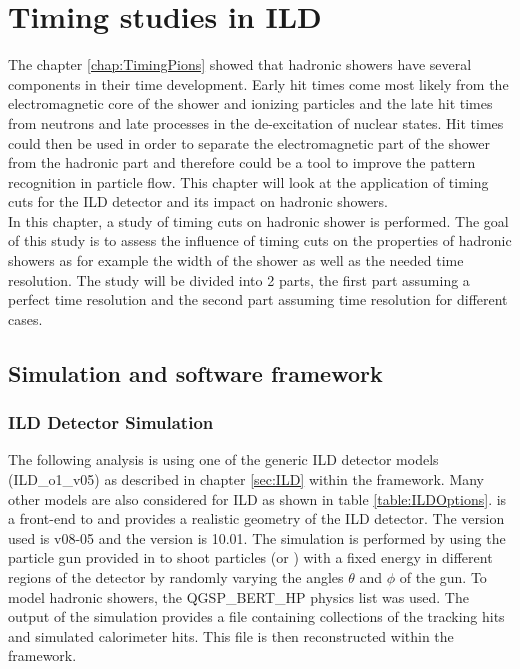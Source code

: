 \chapter{Timing studies in ILD}

The chapter \ref{chap:TimingPions} showed that hadronic showers have several components in their time development. Early hit times come most likely from the electromagnetic core of the shower and ionizing particles and the late hit times from neutrons and late processes in the de-excitation of nuclear states. Hit times could then be used in order to separate the electromagnetic part of the shower from the hadronic part and therefore could be a tool to improve the pattern recognition in particle flow. This chapter will look at the application of timing cuts for the ILD detector and its impact on hadronic showers.\\

In this chapter, a study of timing cuts on hadronic shower is performed. The goal of this study is to assess the influence of timing cuts on the properties of hadronic showers as for example the width of the shower as well as the needed time resolution. The study will be divided into 2 parts, the first part assuming a perfect time resolution and the second part assuming time resolution for different cases.

\section{Simulation and software framework}

\subsection{ILD Detector Simulation}

The following analysis is using one of the generic ILD detector models (ILD\_o1\_v05) as described in chapter \ref{sec:ILD} within the \mokka framework. Many other models are also considered for ILD as shown in table \ref{table:ILDOptions}. \mokka is a front-end to \geant and provides a realistic geometry of the ILD detector. The \mokka version used is v08-05 and the \geant version is 10.01.
The simulation is performed by using the particle gun provided in \geant to shoot particles (\piminus or \kzeroL) with a fixed energy in different regions of the detector by randomly varying the angles $\theta$ and $\phi$ of the gun. To model hadronic showers, the QGSP\_BERT\_HP physics list was used. The output of the simulation provides a \lcio file containing collections of the tracking hits and simulated calorimeter hits. This file is then reconstructed within the \marlin framework.

